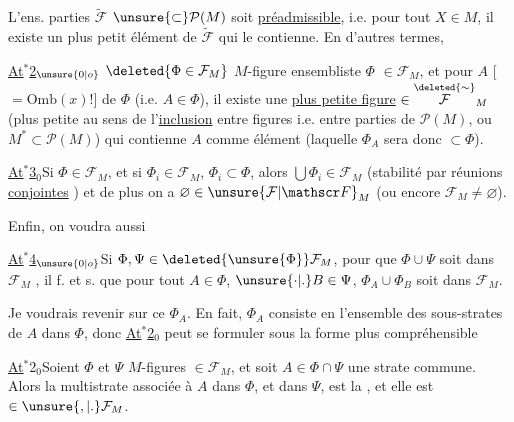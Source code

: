 \quad {} L'ens.  parties $\widetilde{\mathcal F}$  $\unsure{\subset}\mathcal P(M)$ soit \uline{préadmissible}, i.e. pour tout $X\in M$, il existe un plus petit élément de $\widetilde{\mathcal F}$ qui le contienne. En d'autres termes,

\uline{At$^{*}$2}$_{\unsure{0|o}}$\quad
\margin{\rule{0.45pt}{4\baselineskip}}
  $\deleted{\Phi\in\mathcal F_M}$ $M$-figure ensembliste $\Phi$  $\in\mathcal F_M$, et pour $A$ [$=\mathrm{Omb}(x)$!]   de $\Phi$ (i.e. $A\in\Phi$), il existe une \uline{plus petite figure}   $\in\overset{\deleted{\sim}}{\mathcal F}_M$
(plus petite au sens de l'\uline{inclusion} \deleted{\unsure{)}} entre figures i.e. entre parties de $\mathcal P(M)$, ou  $M^{*}\subset\mathcal P(M)$) qui contienne $A$ comme élément (laquelle $\Phi_A$ sera donc $\subset\Phi$).

\uline{At$^{*}$3}$_0$\quad Si $\Phi\in\mathcal F_M$, et si  $\Phi_i\in\mathcal F_M$, $\Phi_i\subset\Phi$, alors $\bigcup\Phi_i\in\mathcal F_M$ (stabilité par réunions \uline{conjointes} )
et de plus on a $\varnothing\in\unsure{\mathcal F|\mathscr F}_M$ (ou encore $\mathcal F_M\neq\varnothing$).

Enfin, on voudra aussi

\uline{At$^{*}$4}$_{\unsure{0|o}}$\quad Si $\Phi,\Psi\in\deleted{\unsure{\Phi}}\mathcal F_M$, pour que $\Phi\cup\Psi$ soit  dans $\mathcal F_M$ , il f. et s. que pour tout $A\in\Phi$, $\unsure{\cdot|.}B\in\Psi$, $\Phi_A\cup\Phi_B$ soit dans $\mathcal F_M$.

Je voudrais revenir sur ce $\Phi_A$. En fait, $\Phi_A$ consiste en l'ensemble des sous-strates de $A$ dans $\Phi$, donc \uline{At$^{*}$2}$_0$ peut se formuler sous la forme plus compréhensible

\uline{At$^{*}$}2$_0$\quad Soient $\Phi$ et $\Psi$  $M$-figures $\in\mathcal F_M$, et soit $A\in\Phi\cap\Psi$ une strate commune. Alors la multistrate associée à $A$ dans $\Phi$, et dans $\Psi$, est la , et elle est $\in\unsure{,|.}\mathcal F_M$.

